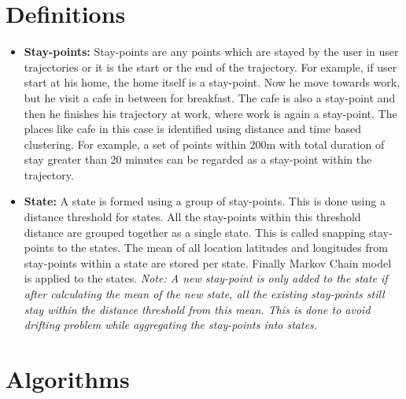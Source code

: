 \documentclass{article}
\begin{document}
\section{Definitions}
\begin{itemize}
	\item \textbf{Stay-points:} Stay-points are any points which are stayed by the user in user trajectories or it is the start or the end of the trajectory. For example, if user start at his home, the home itself is a stay-point. Now he move towards work, but he visit a cafe in between for breakfast. The cafe is also a stay-point and then he finishes his trajectory at work, where work is again a stay-point. The places like cafe in this case is identified using distance and time based clustering. For example, a set of points within 200m with total duration of stay greater than 20 minutes can be regarded as a stay-point within the trajectory.
	\item \textbf{State:} A state is formed using a group of stay-points. This is done using a distance threshold for states. All the stay-points within this threshold distance are grouped together as a single state. This is called snapping stay-points to the states. The mean of all location latitudes and longitudes from stay-points within a state are stored per state. Finally Markov Chain model is applied to the states. \textit{Note: A new stay-point is only added to the state if after calculating the mean of the new state, all the existing stay-points still stay within the distance threshold from this mean. This is done to avoid drifting problem while aggregating the stay-points into states.}
\end{itemize}

\section{Algorithms}

\end{document}
